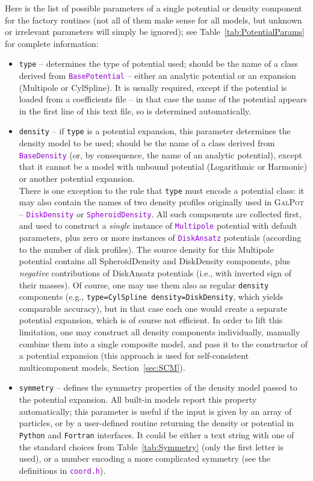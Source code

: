 \documentclass[12pt]{article}
\newcommand{\Python}{\texttt{Python}\xspace}
\newcommand{\Fortran}{\texttt{Fortran}\xspace}
\newcommand{\ttt}[1]{\textcolor{darkviolet}{\texttt{#1}}}
\newcommand{\ppp}[1]{\textcolor{darkolive} {\texttt{#1}}}
\begin{document}
Here is the list of possible parameters of a single potential or density component for the factory routines (not all of them make sense for all models, but unknown or irrelevant parameters will simply be ignored); see Table~\ref{tab:PotentialParams} for complete information:
\begin{itemize}
\item \ppp{type} -- determines the type of potential used; should be the name of a class derived from \ttt{BasePotential} -- either an analytic potential or an expansion (Multipole or CylSpline). It is usually required, except if the potential is loaded from a coefficients file -- in that case the name of the potential appears in the first line of this text file, so is determined automatically.
\item \ppp{density} -- if \ppp{type} is a potential expansion, this parameter determines the density model to be used; should be the name of a class derived from \ttt{BaseDensity} (or, by consequence, the name of an analytic potential), except that it cannot be a model with unbound potential (Logarithmic or Harmonic) or another potential expansion.\\
There is one exception to the rule that \ppp{type} must encode a potential class: it may also contain the names of two density profiles originally used in \textsc{GalPot} -- \ttt{DiskDensity} or \ttt{SpheroidDensity}. All such components are collected first, and used to construct a \textit{single} instance of \ttt{Multipole} potential with default parameters, plus zero or more instances of \ttt{DiskAnsatz} potentials (according to the number of disk profiles). The source density for this Multipole potential contains all SpheroidDensity and DiskDensity components, plus \textit{negative} contributions of DiskAnsatz potentials (i.e., with inverted sign of their masses). Of course, one may use them also as regular \ppp{density} components (e.g., \ppp{type=CylSpline density=DiskDensity}, which yields comparable accuracy), but in that case each one would create a separate potential expansion, which is of course not efficient. In order to lift this limitation, one may construct all density components individually, manually combine them into a single composite model, and pass it to the constructor of a potential expansion (this approach is used for self-consistent multicomponent models, Section~\ref{sec:SCM}).
\item \ppp{symmetry} -- defines the symmetry properties of the density model passed to the potential expansion. All built-in models report this property automatically; this parameter is useful if the input is given by an array of particles, or by a user-defined routine returning the density or potential in \Python and \Fortran interfaces. It could be either a text string with one of the standard choices from Table~\ref{tab:Symmetry} (only the first letter is used), or a number encoding a more complicated symmetry (see the definitions in \ttt{coord.h}).

\end{itemize}
\end{document}
